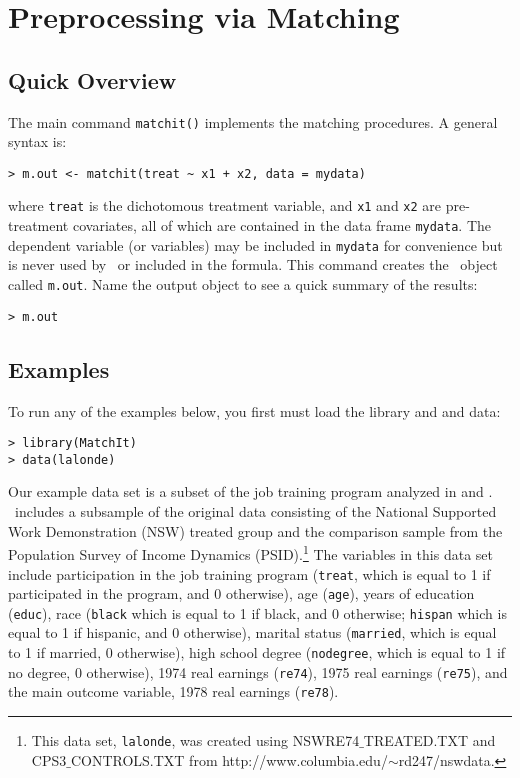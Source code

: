 \section{Preprocessing via Matching}
\label{sec:matching}

\subsection{Quick Overview}

The main command \texttt{matchit()} implements the matching
procedures.  A general syntax is:
\begin{verbatim}
> m.out <- matchit(treat ~ x1 + x2, data = mydata)
\end{verbatim}
where {\tt treat} is the dichotomous treatment variable, and {\tt x1}
and {\tt x2} are pre-treatment covariates, all of which are contained
in the data frame {\tt mydata}.  The dependent variable (or variables)
may be included in \texttt{mydata} for convenience but is never used
by \MatchIt\ or included in the formula.  This command creates the
\MatchIt\ object called \texttt{m.out}.  Name the output object to see
a quick summary of the results:
\begin{verbatim}
> m.out
\end{verbatim}

\subsection{Examples}

To run any of the examples below, you first must load the library and
and data:
\begin{verbatim}
> library(MatchIt)
> data(lalonde)
\end{verbatim}

Our example data set is a subset of the job training program analyzed
in \citet{lalonde86} and \citet{DehWah99}. \MatchIt\ includes a
subsample of the original data consisting of the National Supported
Work Demonstration (NSW) treated group and the comparison sample from
the Population Survey of Income Dynamics (PSID).\footnote{This data
  set, \texttt{lalonde}, was created using NSWRE74$\_$TREATED.TXT and
  CPS3$\_$CONTROLS.TXT from
  http://www.columbia.edu/$\sim$rd247/nswdata.}  The variables in this
data set include participation in the job training program
(\texttt{treat}, which is equal to 1 if participated in the program,
and 0 otherwise), age ({\tt age}), years of education ({\tt educ}),
race (\texttt{black} which is equal to 1 if black, and 0 otherwise;
\texttt{hispan} which is equal to 1 if hispanic, and 0 otherwise),
marital status (\texttt{married}, which is equal to 1 if married, 0
otherwise), high school degree (\texttt{nodegree}, which is equal to 1
if no degree, 0 otherwise), 1974 real earnings (\texttt{re74}), 1975
real earnings (\texttt{re75}), and the main outcome variable, 1978
real earnings (\texttt{re78}).

